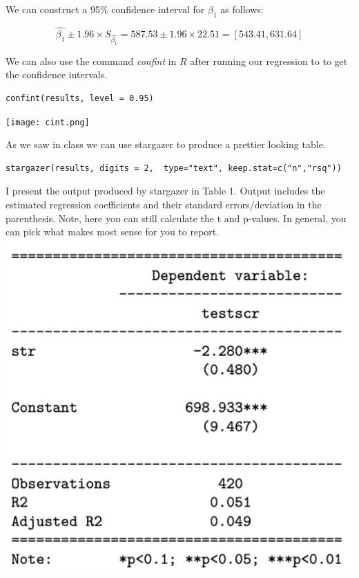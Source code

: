 \documentclass{./../handout}
\begin{document}
 We can construct a 95\% confidence interval for $\beta_1$ as follows:
 
 $$ \hat{\beta_1} \pm 1.96 \times S_{\hat{\beta_1}} = 587.53 \pm 1.96 \times 22.51 = [543.41, 631.64]  $$
 
 We can also use the command \textit{confint} in $R$ after running our regression to to get the confidence intervals. 
 
\begin{lstlisting}
confint(results, level = 0.95)
\end{lstlisting}

\texttt{[image: cint.png]} \\

\newpage

As we saw in class we can use stargazer to produce a prettier looking table. 
\begin{verbatim}
stargazer(results, digits = 2,  type="text", keep.stat=c("n","rsq"))
\end{verbatim}

 I present the output produced by stargazer in Table 1. Output includes the estimated regression coefficients and their standard errors/deviation in the parenthesis. Note, here you can still calculate the t and p-values. In general, you can pick what makes most sense for you to report. \\

\includegraphics[scale=0.5]{reg_output_stargazer}
 
\end{document}
